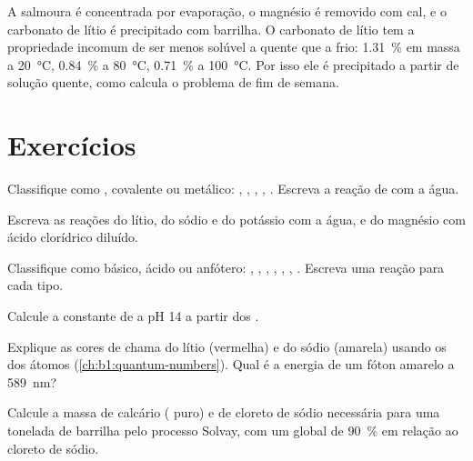 A salmoura é concentrada por evaporação, o magnésio é removido com cal,
e o carbonato de lítio é precipitado com barrilha. O carbonato de lítio
tem a propriedade incomum de ser menos solúvel a quente que a frio:
\qty{1.31}{\percent} em massa a \qty{20}{\celsius}, \qty{0.84}{\percent} a
\qty{80}{\celsius}, \qty{0.71}{\percent} a \qty{100}{\celsius}. Por isso ele
é precipitado a partir de solução quente, como calcula o problema de fim
de semana.

\section{Exercícios}

\begin{exercise}[$\star$]\label{exo:b1:s-block:1}
Classifique como , covalente ou metálico: , ,
, , . Escreva a reação de  com a água.
\end{exercise}

\begin{exercise}[$\star$]\label{exo:b1:s-block:2}
Escreva as reações do lítio, do sódio e do potássio com a água, e do
magnésio com ácido clorídrico diluído.
\end{exercise}

\begin{exercise}[$\star$]\label{exo:b1:s-block:3}
Classifique como básico, ácido ou anfótero: , , ,
, , , . Escreva uma reação para cada tipo.
\end{exercise}

\begin{exercise}[$\star$]\label{exo:b1:s-block:4}
Calcule a constante de  a pH 14 a partir dos
.
\end{exercise}

\begin{exercise}[$\star\star$]\label{exo:b1:s-block:5}
Explique as cores de chama do lítio (vermelha) e do sódio (amarela) usando
os  dos átomos (\cref{ch:b1:quantum-numbers}). Qual é a
energia de um fóton amarelo a \qty{589}{nm}?
\end{exercise}

\begin{exercise}[$\star\star$]\label{exo:b1:s-block:6}
Calcule a massa de calcário ( puro) e de cloreto de sódio
necessária para uma tonelada de barrilha pelo processo Solvay, com um
 global de \qty{90}{\percent} em relação ao cloreto de sódio.
\end{exercise}

